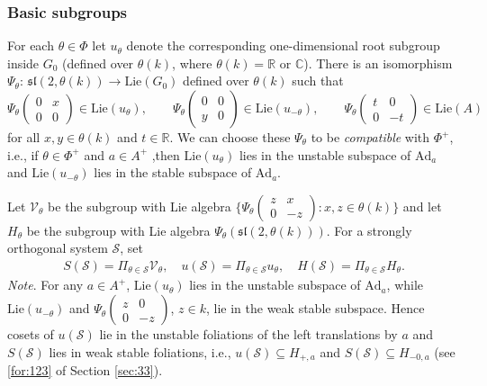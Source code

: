 \documentclass[11 pt]{amsart}
\newcommand{\RR}{\mathbb{R}}
\newcommand{\CC}{\mathbb{C}}
\theoremstyle{definition}
\numberwithin{equation}{section}
\def\Lie{\mathrm{Lie}}
\begin{document}
\subsubsection{Basic subgroups}\label{for:221}   For each $\theta\in \Phi$ let $u_\theta$ denote the corresponding one-dimensional  root subgroup inside $G_0$ (defined over $\theta(k)$, where $\theta(k)=\RR$ or $\CC$).  There is an isomorphism $\Psi_\theta:\,\mathfrak{sl}(2,\theta(k))\to \text{Lie}(G_0)$ defined over $\theta(k)$ such that
\[
\Psi_\theta\!\begin{pmatrix} 0 & x \\ 0 & 0 \end{pmatrix} \in\Lie(u_\theta),\qquad
\Psi_\theta\!\begin{pmatrix} 0 & 0 \\ y & 0 \end{pmatrix} \in\Lie(u_{-\theta}),\qquad
\Psi_\theta\!\begin{pmatrix} t & 0 \\ 0 & -t \end{pmatrix} \in \text{Lie}(A)
\]
for all $x, y \in \theta(k)$ and $t \in \RR$. We can choose these $\Psi_\theta$ to be \emph{compatible} with $\Phi^+$, i.e., if $\theta\in \Phi^+$ and $a\in A^+$ ,then $\Lie(u_\theta)$ lies in the unstable subspace of $\text{Ad}_a$ and $\Lie(u_{-\theta})$ lies in the stable subspace of $\text{Ad}_a$.

Let $\mathcal{V}_\theta$ be the subgroup with Lie algebra $\{\Psi_\theta\!\begin{pmatrix} z & x \\ 0 & -z \end{pmatrix}:x,z\in \theta(k)\}$ and let $H_\theta$ be the subgroup with Lie algebra $\Psi_\theta(\mathfrak{sl}(2,\theta(k)))$. For a strongly orthogonal system $\mathcal{S}$, set
\begin{align*}
 S(\mathcal{S})=\Pi_{\theta\in \mathcal{S}}\mathcal{V}_\theta,\quad u(\mathcal{S})=\Pi_{\theta\in \mathcal{S}}u_{\theta},\quad H(\mathcal{S})= \Pi_{\theta\in \mathcal{S}}H_{\theta}.
\end{align*}
\emph{Note}. For any $a\in A^+$,  $\Lie(u_\theta)$ lies in the unstable subspace of $\text{Ad}_a$, while $\Lie(u_{-\theta})$ and $\Psi_\theta \begin{pmatrix} z & 0 \\ 0 & -z \end{pmatrix}$, $z\in k$, lie in the weak stable subspace. Hence  cosets of $u(\mathcal{S})$  lie in the unstable foliations of the left translations by $a$ and $S(\mathcal{S})$ lies in weak stable foliations, i.e., $u(\mathcal{S})\subseteq H_{+,a}$ and $S(\mathcal{S})\subseteq H_{-0,a}$ (see \eqref{for:123} of Section \ref{sec:33}).
\end{document}
